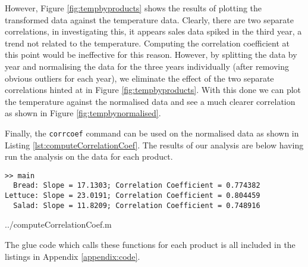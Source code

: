 

However, Figure \ref{fig:tempbyproducts} shows the results of plotting the transformed data against the temperature data. Clearly, there are two separate correlations, in investigating this, it appears sales data spiked in the third year, a trend not related to the temperature. Computing the correlation coefficient at this point would be ineffective for this reason. However, by splitting the data by year and normalising the data for the three years individually (after removing obvious outliers for each year), we eliminate the effect of the two separate correlations hinted at in Figure \ref{fig:tempbyproducts}. With this done we can plot the temperature against the normalised data and see a much clearer correlation as shown in Figure \ref{fig:tempbynormalised}.

Finally, the \texttt{corrcoef} command can be used on the normalised data as shown in Listing \ref{lst:computeCorrelationCoef}. The results of our analysis are below having run the analysis on the data for each product.


\begin{verbatim}
>> main
  Bread: Slope = 17.1303; Correlation Coefficient = 0.774382
Lettuce: Slope = 23.0191; Correlation Coefficient = 0.804459
  Salad: Slope = 11.8209; Correlation Coefficient = 0.748916
\end{verbatim}


 {../computeCorrelationCoef.m}

The glue code which calls these functions for each product is all included in the listings in Appendix \ref{appendix:code}.

